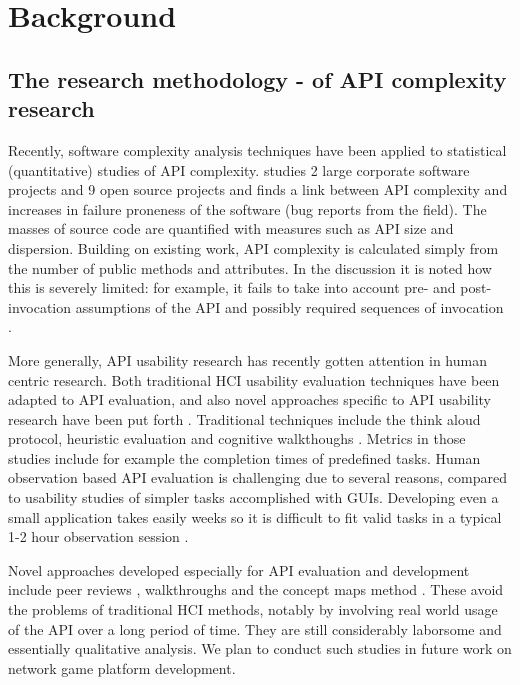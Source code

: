 \documentclass[conference]{IEEEtran}
\begin{document}


\section{Background%
  \label{background}%
}


\subsection{The research methodology - of API complexity research%
  \label{the-research-methodology-of-api-complexity-research}%
}

Recently, software complexity analysis techniques have been applied to
statistical (quantitative) studies of API
complexity. \cite{cmu-api_failures} studies 2 large corporate software
projects and 9 open source projects and finds a link between API
complexity and increases in failure proneness of the software (bug
reports from the field). The masses of source code are quantified with
measures such as API size and dispersion. Building on existing work,
API complexity is calculated simply from the number of public methods
and attributes. In the discussion it is noted how this is severely
limited: for example, it fails to take into account pre- and
post-invocation assumptions of the API and possibly required sequences
of invocation \cite{cmu-api_failures}.

More generally, API usability research has recently gotten attention
in human centric research. Both traditional HCI usability evaluation
techniques have been adapted to API evaluation, and also novel
approaches specific to API usability research have been put forth
\cite{conceptmaps}. Traditional techniques include the think aloud
protocol, heuristic evaluation and cognitive walkthoughs
\cite{overview}. Metrics in those studies include for example the
completion times of predefined tasks. Human observation based API
evaluation is challenging due to several reasons, compared to
usability studies of simpler tasks accomplished with GUIs. Developing
even a small application takes easily weeks so it is difficult to fit
valid tasks in a typical 1-2 hour observation session
\cite{conceptmaps}.

Novel approaches developed especially for API evaluation and
development include peer reviews \cite{apipeerreview}, walkthroughs and
the concept maps method \cite{conceptmaps,overview}. These avoid the
problems of traditional HCI methods, notably by involving real world
usage of the API over a long period of time. They are still
considerably laborsome and essentially qualitative analysis. We plan
to conduct such studies in future work on network game platform
development.
\end{document}
